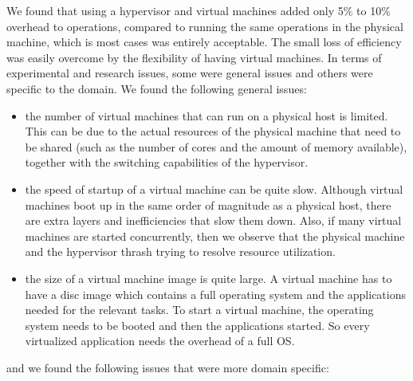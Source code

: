 We found that using a hypervisor and virtual machines added only 5\%
to 10\% overhead to operations, compared to running the same
operations in the physical machine, which is most cases was entirely
acceptable.  The small loss of efficiency was easily overcome by the
flexibility of having virtual machines.
In terms of experimental and research issues, some were general issues
and others were specific to the domain. We found the following general
issues:

\begin{itemize}[itemsep=1ex]
\item the number of virtual machines that can run on a physical host
  is limited.  This can be due to the actual resources of the physical
  machine that need to be shared (such as the number of cores and the
  amount of memory available), together with the switching
  capabilities of the hypervisor.

\item the speed of startup of a virtual machine can be quite
  slow. Although virtual machines boot up in the same order of
  magnitude as a physical host, there are extra layers and
  inefficiencies that slow them down.  Also, if many virtual
  machines are started concurrently, then we observe that the physical
  machine and the hypervisor thrash trying to resolve resource
  utilization. 

\item the size of a virtual machine image is quite large.  A virtual
  machine has to have a disc image which contains a full operating
  system and the applications needed for the relevant tasks.  To start
  a virtual machine, the operating system needs to be booted and then
  the applications started.  So every virtualized application needs
  the overhead of a full OS.

\end{itemize}

\noindent and we found the following issues that were more domain
specific:

